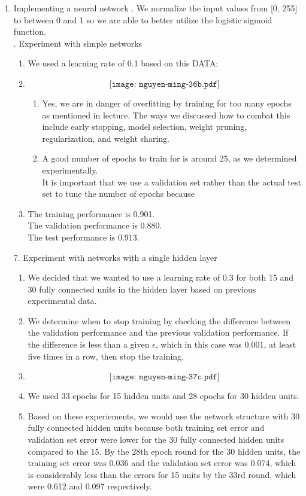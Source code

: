 \documentclass[11pt]{article}
\begin{document}
\begin{enumerate}
\begin{enumerate}
	\end{enumerate}
\item Implementing a neural network
\newline
{}. We normalize the input values from [0, 255] to between 0 and 1 so we are able to better utilize the logistic sigmoid function.\\ 
. Experiment with simple networks
\begin{enumerate}
\item We used a learning rate of 0.1 based on this DATA:
\item
$$\texttt{[image: nguyen-ming-36b.pdf]}$$ 
\begin{enumerate}
\item Yes, we are in danger of overfitting by training for too many epochs as mentioned in lecture. The ways we discussed how to combat this include early stopping, model selection, weight pruning, regularization, and weight sharing.
\item A good number of epochs to train for is around 25, as we determined experimentally.
\\It is important that we use a validation set rather than the actual test set to tune the number of epochs because
\end{enumerate}
\item The training performance is 0.901.
\\ The validation performance is 0.880.
\\ The test performance is 0.913.
\end{enumerate} 
7. Experiment with networks with a single hidden layer
\begin{enumerate}
\item We decided that we wanted to use a learning rate of 0.3 for both 15 and 30 fully connected units in the hidden layer based on previous experimental data.
\item We determine when to stop training by checking the difference between the validation performance and the previous validation performance. If the difference is less than a given $\epsilon$, which in this case was 0.001, at least five times in a row, then stop the training.
\item $$\texttt{[image: nguyen-ming-37c.pdf]}$$
\item We used 33 epochs for 15 hidden units and 28 epochs for 30 hidden units.
\item Based on these experiements, we would use the network structure with 30 fully connected hidden units because both training set error and validation set error were lower for the 30 fully connected hidden units compared to the 15. By the 28th epoch round for the 30 hidden units, the training set error was 0.036 and the validation set error was 0.074, which is considerably less than the errors for 15 units by the 33rd round, which were 0.612 and 0.097 respectively.

\end{enumerate}
\end{enumerate}
\end{document}
